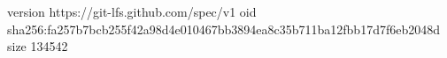 version https://git-lfs.github.com/spec/v1
oid sha256:fa257b7bcb255f42a98d4e010467bb3894ea8c35b711ba12fbb17d7f6eb2048d
size 134542
